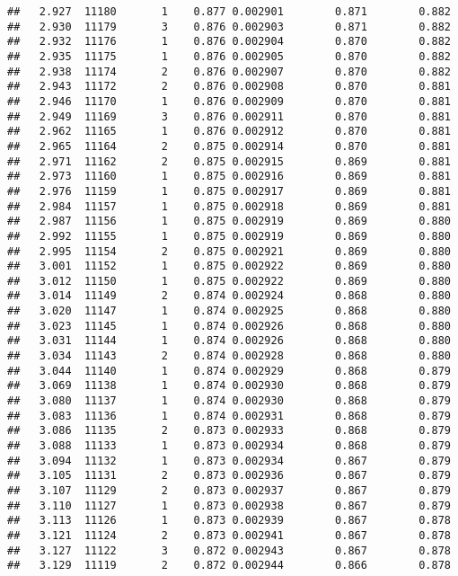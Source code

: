 \documentclass[
]{book}
\begin{document}
\begin{verbatim}
##   2.927  11180       1    0.877 0.002901        0.871        0.882
##   2.930  11179       3    0.876 0.002903        0.871        0.882
##   2.932  11176       1    0.876 0.002904        0.870        0.882
##   2.935  11175       1    0.876 0.002905        0.870        0.882
##   2.938  11174       2    0.876 0.002907        0.870        0.882
##   2.943  11172       2    0.876 0.002908        0.870        0.881
##   2.946  11170       1    0.876 0.002909        0.870        0.881
##   2.949  11169       3    0.876 0.002911        0.870        0.881
##   2.962  11165       1    0.876 0.002912        0.870        0.881
##   2.965  11164       2    0.875 0.002914        0.870        0.881
##   2.971  11162       2    0.875 0.002915        0.869        0.881
##   2.973  11160       1    0.875 0.002916        0.869        0.881
##   2.976  11159       1    0.875 0.002917        0.869        0.881
##   2.984  11157       1    0.875 0.002918        0.869        0.881
##   2.987  11156       1    0.875 0.002919        0.869        0.880
##   2.992  11155       1    0.875 0.002919        0.869        0.880
##   2.995  11154       2    0.875 0.002921        0.869        0.880
##   3.001  11152       1    0.875 0.002922        0.869        0.880
##   3.012  11150       1    0.875 0.002922        0.869        0.880
##   3.014  11149       2    0.874 0.002924        0.868        0.880
##   3.020  11147       1    0.874 0.002925        0.868        0.880
##   3.023  11145       1    0.874 0.002926        0.868        0.880
##   3.031  11144       1    0.874 0.002926        0.868        0.880
##   3.034  11143       2    0.874 0.002928        0.868        0.880
##   3.044  11140       1    0.874 0.002929        0.868        0.879
##   3.069  11138       1    0.874 0.002930        0.868        0.879
##   3.080  11137       1    0.874 0.002930        0.868        0.879
##   3.083  11136       1    0.874 0.002931        0.868        0.879
##   3.086  11135       2    0.873 0.002933        0.868        0.879
##   3.088  11133       1    0.873 0.002934        0.868        0.879
##   3.094  11132       1    0.873 0.002934        0.867        0.879
##   3.105  11131       2    0.873 0.002936        0.867        0.879
##   3.107  11129       2    0.873 0.002937        0.867        0.879
##   3.110  11127       1    0.873 0.002938        0.867        0.879
##   3.113  11126       1    0.873 0.002939        0.867        0.878
##   3.121  11124       2    0.873 0.002941        0.867        0.878
##   3.127  11122       3    0.872 0.002943        0.867        0.878
##   3.129  11119       2    0.872 0.002944        0.866        0.878

\end{verbatim}
\end{document}

